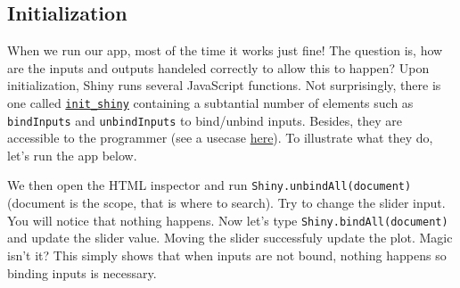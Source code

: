 \documentclass[]{book}
\newenvironment{Shaded}{\begin{snugshade}}{\end{snugshade}}
\newcommand{\ControlFlowTok}[1]{\textcolor[rgb]{0.13,0.29,0.53}{\textbf{#1}}}
\newcommand{\DataTypeTok}[1]{\textcolor[rgb]{0.13,0.29,0.53}{#1}}
\newcommand{\DecValTok}[1]{\textcolor[rgb]{0.00,0.00,0.81}{#1}}
\newcommand{\KeywordTok}[1]{\textcolor[rgb]{0.13,0.29,0.53}{\textbf{#1}}}
\newcommand{\NormalTok}[1]{#1}
\newcommand{\OperatorTok}[1]{\textcolor[rgb]{0.81,0.36,0.00}{\textbf{#1}}}
\newcommand{\StringTok}[1]{\textcolor[rgb]{0.31,0.60,0.02}{#1}}
\begin{document}
\hypertarget{initialization}{%
\subsection{Initialization}\label{initialization}}

When we run our app, most of the time it works just fine! The question is, how are the inputs and outputs handeled correctly to allow this to happen? Upon initialization, Shiny runs several JavaScript functions. Not surprisingly, there is one called \href{https://github.com/rstudio/shiny/blob/master/srcjs/init_shiny.js}{\texttt{init\_shiny}} containing a subtantial number of elements such as \texttt{bindInputs} and \texttt{unbindInputs} to bind/unbind inputs. Besides, they are accessible to the programmer (see a usecase \href{https://stackoverflow.com/questions/51633326/dateinput-not-working-on-dt-in-shiny}{here}). To illustrate what they do, let's run the app below.

\begin{Shaded}
\end{Shaded}

We then open the HTML inspector and run \texttt{Shiny.unbindAll(document)} (document is the scope, that is where to search). Try to change the slider input. You will notice that nothing happens. Now let's type \texttt{Shiny.bindAll(document)} and update the slider value. Moving the slider successfuly update the plot. Magic isn't it? This simply shows that when inputs are not bound, nothing happens so binding inputs is necessary.
\end{document}
